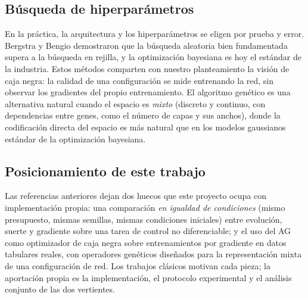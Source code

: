 \subsection{Búsqueda de hiperparámetros}

En la práctica, la arquitectura y los hiperparámetros se eligen por prueba y error. Bergstra y Bengio \cite{bergstra2012} demostraron que la búsqueda aleatoria bien fundamentada supera a la búsqueda en rejilla, y la optimización bayesiana \citep{snoek2012} es hoy el estándar de la industria. Estos métodos comparten con nuestro planteamiento la visión de caja negra: la calidad de una configuración se mide entrenando la red, sin observar los gradientes del propio entrenamiento. El algoritmo genético es una alternativa natural cuando el espacio es \emph{mixto} (discreto y continuo, con dependencias entre genes, como el número de capas y sus anchos), donde la codificación directa del espacio es más natural que en los modelos gaussianos estándar de la optimización bayesiana.

\subsection{Posicionamiento de este trabajo}

Las referencias anteriores dejan dos huecos que este proyecto ocupa con implementación propia: una comparación \emph{en igualdad de condiciones} (mismo presupuesto, mismas semillas, mismas condiciones iniciales) entre evolución, suerte y gradiente sobre una tarea de control no diferenciable; y el uso del AG como optimizador de caja negra sobre entrenamientos por gradiente en datos tabulares reales, con operadores genéticos diseñados para la representación mixta de una configuración de red. Los trabajos clásicos motivan cada pieza; la aportación propia es la implementación, el protocolo experimental y el análisis conjunto de las dos vertientes.
